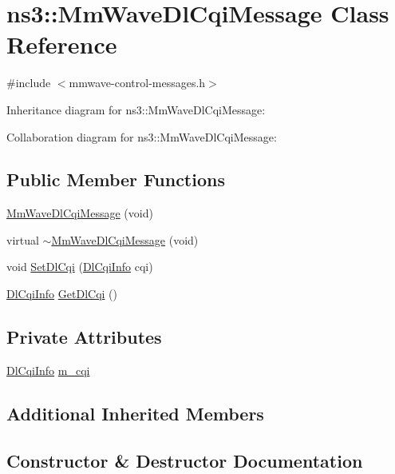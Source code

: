 \hypertarget{classns3_1_1MmWaveDlCqiMessage}{}\section{ns3\+:\+:Mm\+Wave\+Dl\+Cqi\+Message Class Reference}
\label{classns3_1_1MmWaveDlCqiMessage}


{\ttfamily \#include $<$mmwave-\/control-\/messages.\+h$>$}



Inheritance diagram for ns3\+:\+:Mm\+Wave\+Dl\+Cqi\+Message\+:


Collaboration diagram for ns3\+:\+:Mm\+Wave\+Dl\+Cqi\+Message\+:
\subsection*{Public Member Functions}
\begin{DoxyCompactItemize}
\item 
\hyperlink{classns3_1_1MmWaveDlCqiMessage_a49e350ef571024dd5ae95dea60951fbb}{Mm\+Wave\+Dl\+Cqi\+Message} (void)
\item 
virtual \hyperlink{classns3_1_1MmWaveDlCqiMessage_a18a15fbd89b17d1cd7fd1c2fd556cd14}{$\sim$\+Mm\+Wave\+Dl\+Cqi\+Message} (void)
\item 
void \hyperlink{classns3_1_1MmWaveDlCqiMessage_a2e9d73ec65957586c517d9e7efe809f4}{Set\+Dl\+Cqi} (\hyperlink{structns3_1_1DlCqiInfo}{Dl\+Cqi\+Info} cqi)
\item 
\hyperlink{structns3_1_1DlCqiInfo}{Dl\+Cqi\+Info} \hyperlink{classns3_1_1MmWaveDlCqiMessage_a72818dfe792bbb4de6907dd108deb6b3}{Get\+Dl\+Cqi} ()
\end{DoxyCompactItemize}
\subsection*{Private Attributes}
\begin{DoxyCompactItemize}
\item 
\hyperlink{structns3_1_1DlCqiInfo}{Dl\+Cqi\+Info} \hyperlink{classns3_1_1MmWaveDlCqiMessage_a7534f2768801d203923051ae65fc313f}{m\+\_\+cqi}
\end{DoxyCompactItemize}
\subsection*{Additional Inherited Members}


\subsection{Constructor \& Destructor Documentation}

